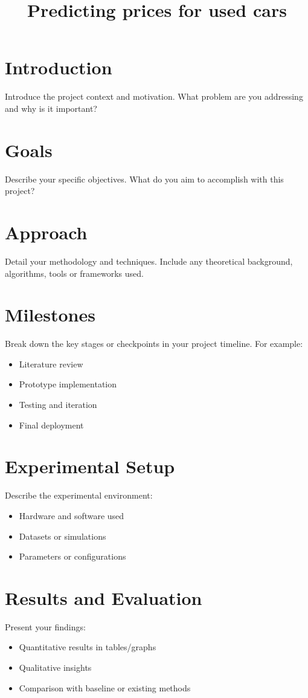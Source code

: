 \documentclass[conference]{IEEEtran}
\title{Predicting prices for used cars}
\author{
    \IEEEauthorblockN{Julios Fotiou}
    \IEEEauthorblockN{Andreas Hadjoullis}
    \IEEEauthorblockA{
        Computer Science \\
        University of Cyprus \\
    }
}
\begin{document}
\maketitle

\section{Introduction}
Introduce the project context and motivation. What problem are you addressing and why is it important?

\section{Goals}
Describe your specific objectives. What do you aim to accomplish with this project?

\section{Approach}
Detail your methodology and techniques. Include any theoretical background, algorithms, tools or frameworks used.

\section{Milestones}
Break down the key stages or checkpoints in your project timeline. For example:
\begin{itemize}
    \item Literature review
    \item Prototype implementation
    \item Testing and iteration
    \item Final deployment
\end{itemize}

\section{Experimental Setup}
Describe the experimental environment:
\begin{itemize}
    \item Hardware and software used
    \item Datasets or simulations
    \item Parameters or configurations
\end{itemize}

\section{Results and Evaluation}
Present your findings:
\begin{itemize}
    \item Quantitative results in tables/graphs
    \item Qualitative insights
    \item Comparison with baseline or existing methods
\end{itemize}
\end{document}
